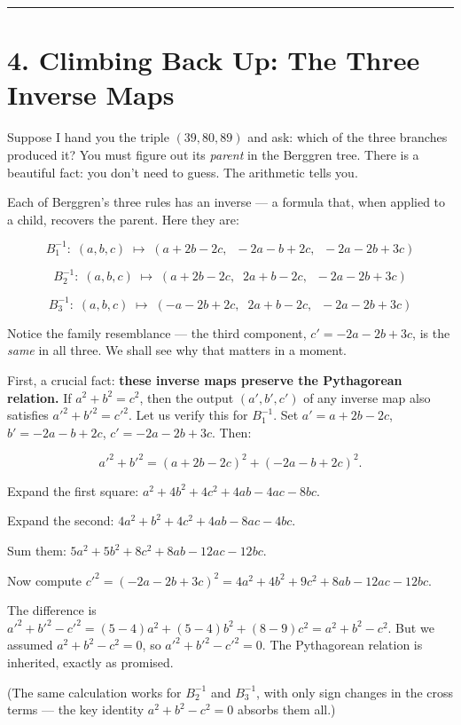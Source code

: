 \documentclass[11pt,openany]{book}
\theoremstyle{definition}
\theoremstyle{plain}
\theoremstyle{remark}
\begin{document}
\bigskip\noindent\rule{\textwidth}{0.4pt}\bigskip


\section{4. Climbing Back Up: The Three Inverse Maps}


Suppose I hand you the triple $(39, 80, 89)$ and ask: which of the three branches produced it? You must figure out its \textit{parent} in the Berggren tree. There is a beautiful fact: you don't need to guess. The arithmetic tells you.

Each of Berggren's three rules has an inverse — a formula that, when applied to a child, recovers the parent. Here they are:

$$B_1^{-1}:\; (a,b,c) \;\longmapsto\; (a + 2b - 2c,\;\; -2a - b + 2c,\;\; -2a - 2b + 3c)$$

$$B_2^{-1}:\; (a,b,c) \;\longmapsto\; (a + 2b - 2c,\;\; 2a + b - 2c,\;\; -2a - 2b + 3c)$$

$$B_3^{-1}:\; (a,b,c) \;\longmapsto\; (-a - 2b + 2c,\;\; 2a + b - 2c,\;\; -2a - 2b + 3c)$$

Notice the family resemblance — the third component, $c' = -2a - 2b + 3c$, is the \textit{same} in all three. We shall see why that matters in a moment.

First, a crucial fact: \textbf{these inverse maps preserve the Pythagorean relation.} If $a^2 + b^2 = c^2$, then the output $(a', b', c')$ of any inverse map also satisfies ${a'}^2 + {b'}^2 = {c'}^2$. Let us verify this for $B_1^{-1}$. Set $a' = a + 2b - 2c$, $b' = -2a - b + 2c$, $c' = -2a - 2b + 3c$. Then:

$${a'}^2 + {b'}^2 = (a + 2b - 2c)^2 + (-2a - b + 2c)^2.$$

Expand the first square: $a^2 + 4b^2 + 4c^2 + 4ab - 4ac - 8bc$.

Expand the second: $4a^2 + b^2 + 4c^2 + 4ab - 8ac - 4bc$.

Sum them: $5a^2 + 5b^2 + 8c^2 + 8ab - 12ac - 12bc$.

Now compute ${c'}^2 = (-2a - 2b + 3c)^2 = 4a^2 + 4b^2 + 9c^2 + 8ab - 12ac - 12bc$.

The difference is ${a'}^2 + {b'}^2 - {c'}^2 = (5-4)a^2 + (5-4)b^2 + (8-9)c^2 = a^2 + b^2 - c^2$. But we assumed $a^2 + b^2 - c^2 = 0$, so ${a'}^2 + {b'}^2 - {c'}^2 = 0$. The Pythagorean relation is inherited, exactly as promised.

(The same calculation works for $B_2^{-1}$ and $B_3^{-1}$, with only sign changes in the cross terms — the key identity $a^2 + b^2 - c^2 = 0$ absorbs them all.)
\end{document}
